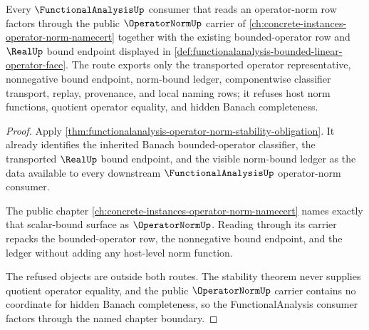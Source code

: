 \begin{theorem}
\label{thm:functionalanalysis-operator-norm-chapter-route}
Every $\FunctionalAnalysisUp$ consumer that reads an operator-norm row factors through the public $\OperatorNormUp$ carrier of \autoref{ch:concrete-instances-operator-norm-namecert} together with the existing bounded-operator row and $\RealUp$ bound endpoint displayed in \autoref{def:functionalanalysis-bounded-linear-operator-face}. The route exports only the transported operator representative, nonnegative bound endpoint, norm-bound ledger, componentwise classifier transport, replay, provenance, and local naming rows; it refuses host norm functions, quotient operator equality, and hidden Banach completeness.
\end{theorem}
\begin{proof}
Apply \autoref{thm:functionalanalysis-operator-norm-stability-obligation}. It already identifies the inherited Banach bounded-operator classifier, the transported $\RealUp$ bound endpoint, and the visible norm-bound ledger as the data available to every downstream $\FunctionalAnalysisUp$ operator-norm consumer.

The public chapter \autoref{ch:concrete-instances-operator-norm-namecert} names exactly that scalar-bound surface as $\OperatorNormUp$. Reading through its carrier repacks the bounded-operator row, the nonnegative bound endpoint, and the ledger without adding any host-level norm function.

The refused objects are outside both routes. The stability theorem never supplies quotient operator equality, and the public $\OperatorNormUp$ carrier contains no coordinate for hidden Banach completeness, so the FunctionalAnalysis consumer factors through the named chapter boundary.
\end{proof}

